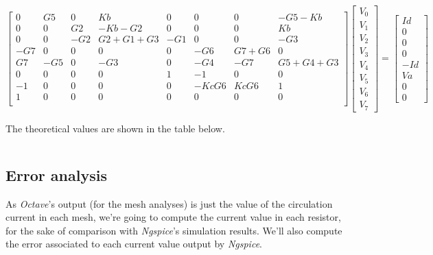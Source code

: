 $$
\begin{bmatrix}
0 & G5 & 0 & Kb & 0 & 0 & 0 & -G5-Kb \\
0 & 0 & G2 & -Kb-G2 & 0 & 0 & 0 & Kb \\
0 & 0 & -G2 & G2+G1+G3 & -G1 & 0 & 0 & -G3 \\
-G7 & 0 & 0 & 0 & 0 & -G6 & G7+G6 & 0 \\
G7 & -G5 & 0 & -G3 & 0 & -G4 & -G7 & G5+G4+G3 \\
0 & 0 & 0 & 0 & 1 & -1 & 0 & 0 \\
-1 & 0 & 0 & 0 & 0 & -KcG6 & KcG6 & 1 \\
1 & 0 & 0 & 0 & 0 & 0 & 0 & 0 \\
\end{bmatrix}
\begin{bmatrix}
V_0 \\
V_1 \\
V_2 \\
V_3 \\
V_4 \\
V_5 \\
V_6 \\
V_7  
\end{bmatrix}
=
\begin{bmatrix}
Id \\
0 \\
0 \\
0 \\
-Id \\
Va \\
0 \\
0  
\end{bmatrix}
$$

The theoretical values are shown in the table below.
\vspace{5mm}
\begin{table}[H]
\centering
\begin{tabularx}{0.8\textwidth} {
  | >{\raggedright\arraybackslash}X
  | >{\raggedleft\arraybackslash}X | }
 \hline

\end{tabularx}
\end{table}

\subsection{Error analysis}
\label{ssec:Error analysis}
\par As \emph{Octave}'s output (for the mesh analyses) is just the value of the circulation current in each mesh, we're going to compute the current value in each resistor, for the sake of comparison with \emph{Ngspice}'s simulation results. We'll also compute the error associated to each current value output by \emph{Ngspice}.
\vspace{5mm}

